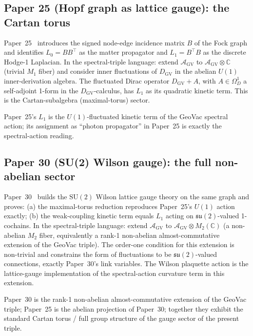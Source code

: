 \documentclass[11pt]{article}
\begin{document}
\subsection{Paper 25 (Hopf graph as lattice gauge): the Cartan torus}

Paper~25~\cite{paper25} introduces the signed node-edge incidence
matrix $B$ of the Fock graph and identifies $L_0 = BB^{\top}$ as the
matter propagator and $L_1 = B^{\top}B$ as the discrete
Hodge-1 Laplacian.  In the spectral-triple language: extend
$\mathcal{A}_{\mathrm{GV}}$ to
$\mathcal{A}_{\mathrm{GV}} \otimes \mathbb{C}$ (trivial $M_1$ fiber)
and consider inner fluctuations of $D_{\mathrm{GV}}$ in the abelian
$U(1)$ inner-derivation algebra.  The fluctuated Dirac operator
$D_{\mathrm{GV}} + A$, with $A \in \Omega_D^1$ a self-adjoint 1-form
in the $D_{\mathrm{GV}}$-calculus, has $L_1$ as its quadratic kinetic
term.  This is the Cartan-subalgebra (maximal-torus) sector.

Paper~25's $L_1$ is the $U(1)$-fluctuated kinetic term of the GeoVac
spectral action; its assignment as ``photon propagator'' in Paper~25
is exactly the spectral-action reading.

\subsection{Paper 30 (SU(2) Wilson gauge): the full non-abelian sector}

Paper~30~\cite{paper30} builds the $\mathrm{SU}(2)$ Wilson lattice
gauge theory on the same graph and proves: (a) the maximal-torus
reduction reproduces Paper~25's $U(1)$ action exactly; (b) the
weak-coupling kinetic term equals $L_1$ acting on
$\mathfrak{su}(2)$-valued 1-cochains.  In the spectral-triple
language: extend $\mathcal{A}_{\mathrm{GV}}$ to
$\mathcal{A}_{\mathrm{GV}} \otimes M_2(\mathbb{C})$ (a non-abelian
$M_2$ fiber, equivalently a rank-1 non-abelian almost-commutative
extension of the GeoVac triple).  The order-one condition for this
extension is non-trivial and constrains the form of fluctuations to be
$\mathfrak{su}(2)$-valued connections, exactly Paper~30's link
variables.  The Wilson plaquette action is the lattice-gauge
implementation of the spectral-action curvature term in this
extension.

Paper~30 is the rank-1 non-abelian almost-commutative extension of the
GeoVac triple; Paper~25 is the abelian projection of Paper~30;
together they exhibit the standard Cartan torus / full group structure
of the gauge sector of the present triple.
\end{document}
